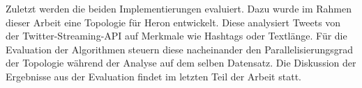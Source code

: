 Zuletzt werden die beiden Implementierungen evaluiert.
Dazu wurde im Rahmen dieser Arbeit eine Topologie für Heron entwickelt.
Diese analysiert Tweets von der Twitter-Streaming-API auf Merkmale wie Hashtags oder Textlänge.
Für die Evaluation der Algorithmen steuern diese nacheinander den Parallelisierungsgrad der Topologie während der Analyse auf dem selben Datensatz.
Die Diskussion der Ergebnisse aus der Evaluation findet im letzten Teil der Arbeit statt.